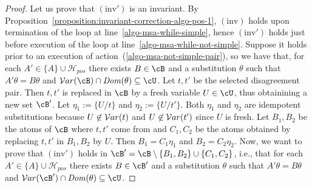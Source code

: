 \documentclass[fleqn]{tlp}
\newcommand{\Dom}{\mathit{Dom}}
\newcommand{\Hpos}{\mathcal{H}_{\mathit{pos}}}
\begin{document}
\begin{appendix}
\begin{proof}
  Let us prove that $\mathrm{(inv')}$ is an invariant.
  By Proposition~\ref{proposition:invariant-correction-algo-pos-1},
  $\mathrm{(inv)}$ holds upon termination of the loop at
  line~\ref{algo-msa-while-simple}, hence $\mathrm{(inv')}$ holds
  just before execution of the loop at
  line~\ref{algo-msa-while-not-simple}.
  Suppose it holds prior to an execution of
  action~(\ref{algo-msa-not-simple-pair}), so we have that, 
  for each $A'\in\{A\}\cup\Hpos$ there exists 
    $B\in\cB$ and a substitution $\theta$ such that
    $A'\theta=B\theta$ and
    $\Var(\cB)\cap\Dom(\theta)
    \subseteq \cU$.
Let $t,t'$ be the selected disagreement pair.
  Then $t,t'$ is replaced in $\cB$ by a fresh variable
  $U\in \cU$, thus obtainining a new set $\cB'$.
  Let $\eta_1:=\{U/t\}$ and $\eta_2:=\{U/t'\}$. Both $\eta_1$ and $\eta_2$
  are idempotent substitutions because $U\not\in {\cal V}ar(t)$ and $U\not\in
  {\cal V}ar(t')$ since $U$ is fresh.
  Let $B_1,B_2$ be the atoms of $\cB$ where $t,t'$ come from
  and $C_1,C_2$ be the atoms obtained by replacing
  $t,t'$ in $B_1,B_2$ by $U$. Then $B_1=C_1\eta_1$ and
  $B_2=C_2\eta_2$. 
Now, we want to prove that $\mathrm{(inv')}$ holds in $\cB' =
  \cB\setminus\{B_1,B_2\}\cup\{C_1,C_2\}$, i.e., that for each
  $A'\in\{A\}\cup\Hpos$ there exists $B\in\cB'$ and a substitution
  $\theta$ such that $A'\theta=B\theta$ and
  $\Var(\cB')\cap\Dom(\theta) \subseteq \cU$.
  

\end{proof}
\end{appendix}
\end{document}
